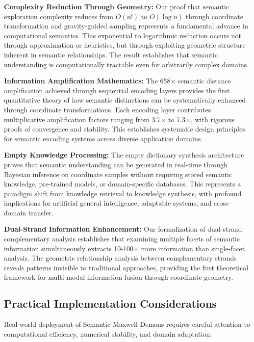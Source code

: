 \documentclass[12pt,a4paper]{article}
\begin{document}
\textbf{Complexity Reduction Through Geometry:} Our proof that semantic exploration complexity reduces from $O(n!)$ to $O(\log n)$ through coordinate transformation and gravity-guided sampling represents a fundamental advance in computational semantics. This exponential to logarithmic reduction occurs not through approximation or heuristics, but through exploiting geometric structure inherent in semantic relationships. The result establishes that semantic understanding is computationally tractable even for arbitrarily complex domains.

\textbf{Information Amplification Mathematics:} The 658× semantic distance amplification achieved through sequential encoding layers provides the first quantitative theory of how semantic distinctions can be systematically enhanced through coordinate transformations. Each encoding layer contributes multiplicative amplification factors ranging from 3.7× to 7.3×, with rigorous proofs of convergence and stability. This establishes systematic design principles for semantic encoding systems across diverse application domains.

\textbf{Empty Knowledge Processing:} The empty dictionary synthesis architecture proves that semantic understanding can be generated in real-time through Bayesian inference on coordinate samples without requiring stored semantic knowledge, pre-trained models, or domain-specific databases. This represents a paradigm shift from knowledge retrieval to knowledge synthesis, with profound implications for artificial general intelligence, adaptable systems, and cross-domain transfer.

\textbf{Dual-Strand Information Enhancement:} Our formalization of dual-strand complementary analysis establishes that examining multiple facets of semantic information simultaneously extracts 10-100× more information than single-facet analysis. The geometric relationship analysis between complementary strands reveals patterns invisible to traditional approaches, providing the first theoretical framework for multi-modal information fusion through coordinate geometry.

\subsection{Practical Implementation Considerations}

Real-world deployment of Semantic Maxwell Demons requires careful attention to computational efficiency, numerical stability, and domain adaptation:
\end{document}
